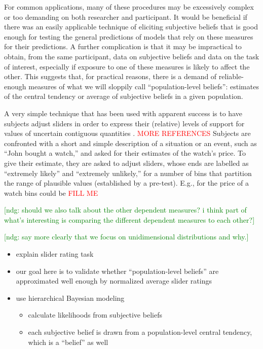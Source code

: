 \documentclass[10pt,letterpaper]{article}
\newcommand{\ndg}[1]{\textcolor{Green}{[ndg: #1]}}
\newcommand{\citep}[1]{\cite{#1}}
\begin{document}
For common applications, many of these procedures may be excessively complex or too demanding
on both researcher and participant. It would be beneficial if there was an easily applicable
technique of eliciting subjective beliefs that is good enough for testing the general
predictions of models that rely on these measures for their predictions. A further complication
is that it may be impractical to obtain, from the same participant, data on subjective beliefs
and data on the task of interest, especially if exposure to one of these measures is likely to
affect the other. This suggests that, for practical reasons, there is a demand of
reliable-enough measures of what we will sloppily call ``population-level beliefs'': estimates
of the central tendency or average of subjective beliefs in a given population.

A very simple technique that has been used with apparent success is to have subjects adjust
sliders in order to express their (relative) levels of support for values of uncertain
contiguous quantities
\citep{KaoWu2014:Nonliteral-Unde,SchollerFranke2015:Semantic-values}. \textcolor{red}{ MORE REFERENCES } Subjects are confronted with a short and simple description of a situation or an
event, such as ``John bought a watch,'' and asked for their estimates of the watch's price. To
give their estimate, they are asked to adjust sliders, whose ends are labelled as ``extremely
likely'' and ``extremely unlikely,'' for a number of bins that partition the range of plausible
values (established by a pre-test). E.g., for the price of a watch bins could be
\textcolor{red}{ FILL ME }

\ndg{should we also talk about the other dependent measures? i think part of what's interesting is comparing the different dependent measures to each other?}

\ndg{say more clearly that we focus on unidimensional distributions and why.}

\begin{itemize}
\item explain slider rating task
\item our goal here is to validate whether ``population-level beliefs'' are approximated well
  enough by normalized average slider ratings
\item use hierarchical Bayesian modeling
  \begin{itemize}
  \item calculate likelihoods from subjective beliefs
  \item each subjective belief is drawn from a population-level central tendency, which is a
    ``belief'' as well
  \end{itemize}
\end{itemize}
\end{document}
